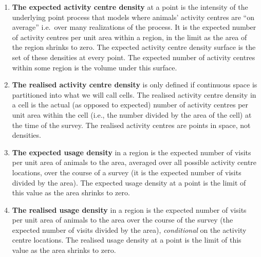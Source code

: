 \documentclass[10pt,a4paper]{article}
\begin{document}
\begin{enumerate}
\item \textbf{The expected activity centre density} at a point is the intensity of the underlying point process that models where animals' activity centres are ``on average''  i.e.\ over many realizations of the process. It is the expected number of activity centres per unit area within a region, in the limit as the area of the region shrinks to zero. The expected activity centre density surface is the set of these densities at every point. The expected number of activity centres within some region is the volume under this surface.
\item \textbf{The realised activity centre density} is only defined if continuous space is partitioned into what we will call cells. The realised activity centre density in a cell is the actual (as opposed to expected) number of activity centres per unit area within the cell (i.e., the number divided by the area of the cell) at the time of the survey. The realised activity centres are points in space, not densities.
\item \textbf{The expected usage density} in a region is the expected number of visits per unit area of animals to the area, averaged over all possible activity centre locations, over the course of a survey (it is the expected number of visits divided by the area). The expected usage density at a point is the limit of this value as the area shrinks to zero. 
\item \textbf{The realised usage density} in a region is the expected number of visits per unit area of animals to the area over the course of the survey (the expected number of visits divided by the area), \textit{conditional} on the activity centre locations. The realised usage density at a point is the limit of this value as the area shrinks to zero. 
\end{enumerate}
\end{document}
